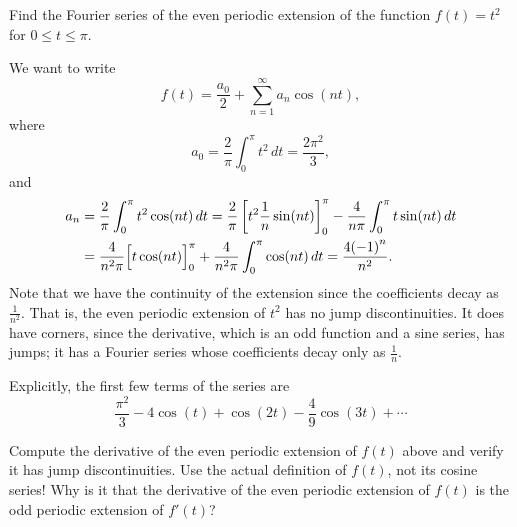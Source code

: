 
\begin{example}
Find the Fourier series of the even periodic extension of 
the function $f(t) = t^2$ for $0 \leq t \leq \pi$.

We want to write
\begin{equation*}
f(t) = \frac{a_0}{2} + \sum_{n=1}^\infty a_n \cos (n t) ,
\end{equation*}
where
\begin{equation*}
a_0 = \frac{2}{\pi}
\int_0^\pi t^2 \, dt = \frac{2 \pi^2}{3} ,
\end{equation*}
and
\begin{equation*}
\begin{split}
a_n & = \frac{2}{\pi}
\int_0^\pi t^2 \cos (n t) \, dt
= \frac{2}{\pi} \left[ t^2 \frac{1}{n} \sin (nt) \right]_0^\pi -
\frac{4}{n\pi}
\int_0^\pi t \sin (n t) \, dt \\
& = 
\frac{4}{n^2\pi}
\Bigl[ t \cos (n t) \Bigr]_0^\pi
+
\frac{4}{n^2\pi}
\int_0^\pi \cos (n t) \, dt
= 
\frac{4{(-1)}^n}{n^2} .
\end{split}
\end{equation*}
Note that we have  the continuity of the extension since the
coefficients decay as $\frac{1}{n^2}$.  That is, the even periodic extension
of $t^2$ has no jump discontinuities.  It does have corners, since
the derivative, which is an odd function and a sine series, has jumps; it has
a Fourier series whose coefficients decay only as $\frac{1}{n}$.

Explicitly, the first few terms of the series are
\begin{equation*}
\frac{\pi^2}{3} - 4 \cos (t) + \cos (2t) - \frac{4}{9} \cos (3t) + \cdots
\end{equation*}
\end{example}

\begin{exercise}
\leavevmode
\begin{tasks}
\task Compute the derivative of the even periodic extension of $f(t)$ above and verify it
has jump discontinuities.  Use the actual definition of $f(t)$, not its cosine
series!
\task Why is it that the derivative of the even periodic extension of $f(t)$ is the
odd periodic extension of $f'(t)$?
\end{tasks}
\end{exercise}

